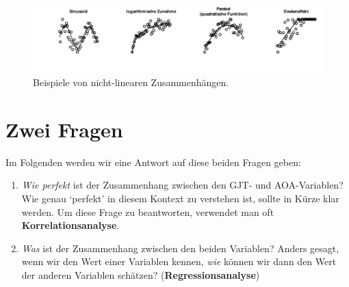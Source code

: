 \documentclass[oneside, 10pt]{book}\usepackage[]{graphicx}\usepackage[]{xcolor}
\newenvironment{knitrout}{}{} %
\begin{document}
\begin{knitrout}
\color{fgcolor}\begin{figure}[tp]

{\centering \includegraphics[width=\textwidth]{figs/unnamed-chunk-178-1} 

}

\caption{Beispiele von nicht-linearen Zusammenhängen.\label{fig:nichtlinear}}\label{fig:unnamed-chunk-178}
\end{figure}

\end{knitrout}

\section{Zwei Fragen}

Im Folgenden werden wir eine Antwort auf diese beiden Fragen geben:
\begin{enumerate}
 \item \emph{Wie perfekt} ist der Zusammenhang zwischen den GJT- und AOA-Variablen?
 Wie genau `perfekt' in diesem Kontext zu verstehen ist, sollte in Kürze klar werden.
 Um diese Frage zu beantworten, verwendet man oft \textbf{Korrelationsanalyse}.

 \item \emph{Was} ist der Zusammenhang zwischen den beiden Variablen?
 Anders gesagt, wenn wir den Wert einer Variablen kennen,
 \emph{wie} können wir dann den Wert der anderen Variablen schätzen?
 (\textbf{Regressionsanalyse})
\end{enumerate}
\end{document}
